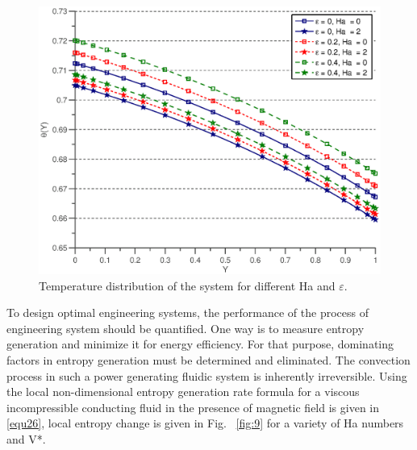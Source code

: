 \begin{figure}
  \includegraphics[scale=0.8]{figures/fig8.eps}
\vspace*{6mm}
\caption{Temperature distribution of the system for different Ha and $\varepsilon $.}
\label{fig:8}       %
\end{figure}

To design optimal engineering systems, the performance of the process of engineering system should be quantified. One way is to measure entropy generation and minimize it for energy efficiency. For that purpose, dominating factors in entropy generation must be determined and eliminated. The convection process in such a power generating fluidic system is inherently irreversible. Using the local non-dimensional entropy generation rate formula for a viscous incompressible conducting fluid in the presence of magnetic field is given in \eqref{equ26}, local entropy change is given in Fig. ~\ref{fig:9} for a variety of Ha numbers and V*.

